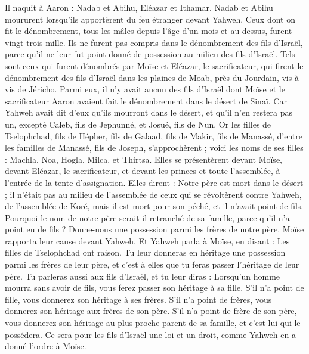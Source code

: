 \begin{multicols}{2}
Il naquit à Aaron : Nadab et Abihu, Eléazar et Ithamar.
Nadab et Abihu moururent lorsqu'ils apportèrent du feu étranger devant Yahweh.
Ceux dont on fit le dénombrement, tous les mâles depuis l'âge d'un mois et au-dessus, furent vingt-trois mille. Ils ne furent pas compris dans le dénombrement des fils d'Israël, parce qu'il ne leur fut point donné de possession au milieu des fils d'Israël.
Tels sont ceux qui furent dénombrés par Moïse et Eléazar, le sacrificateur, qui firent le dénombrement des fils d'Israël dans les plaines de Moab, près du Jourdain, vis-à-vis de Jéricho.
Parmi eux, il n'y avait aucun des fils d'Israël dont Moïse et le sacrificateur Aaron avaient fait le dénombrement dans le désert de Sinaï.
Car Yahweh avait dit d'eux qu'ils mourront dans le désert, et qu'il n'en restera pas un, excepté Caleb, fils de Jephunné, et Josué, fils de Nun.
\VerseOne{}Or les filles de Tselophchad, fils de Hépher, fils de Galaad, fils de Makir, fils de Manassé, d'entre les familles de Manassé, fils de Joseph, s'approchèrent ; voici les noms de ses filles : Machla, Noa, Hogla, Milca, et Thirtsa.
Elles se présentèrent devant Moïse, devant Eléazar, le sacrificateur, et devant les princes et toute l'assemblée, à l'entrée de la tente d'assignation. Elles dirent :
Notre père est mort dans le désert ; il n'était pas au milieu de l'assemblée de ceux qui se révoltèrent contre Yahweh, de l'assemblée de Koré, mais il est mort pour son péché, et il n'avait point de fils.
Pourquoi le nom de notre père serait-il retranché de sa famille, parce qu'il n'a point eu de fils ? Donne-nous une possession parmi les frères de notre père.
Moïse rapporta leur cause devant Yahweh.
Et Yahweh parla à Moïse, en disant :
Les filles de Tselophchad ont raison. Tu leur donneras en héritage une possession parmi les frères de leur père, et c'est à elles que tu feras passer l'héritage de leur père.
Tu parleras aussi aux fils d'Israël, et tu leur diras : Lorsqu'un homme mourra sans avoir de fils, vous ferez passer son héritage à sa fille.
S'il n'a point de fille, vous donnerez son héritage à ses frères.
S'il n'a point de frères, vous donnerez son héritage aux frères de son père.
S'il n'a point de frère de son père, vous donnerez son héritage au plus proche parent de sa famille, et c'est lui qui le possédera. Ce sera pour les fils d'Israël une loi et un droit, comme Yahweh en a donné l'ordre à Moïse.

\end{multicols}
